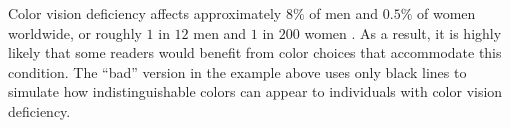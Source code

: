 


\noindent
Color vision deficiency affects approximately $8\%$ of men and $0.5\%$ of women worldwide, or roughly $1$ in $12$ men and $1$ in $200$ women .
As a result, it is highly likely that some readers would benefit from color choices that accommodate this condition.
The ``bad'' version in the example above uses only black lines to simulate how indistinguishable colors can appear to individuals with color vision deficiency.
